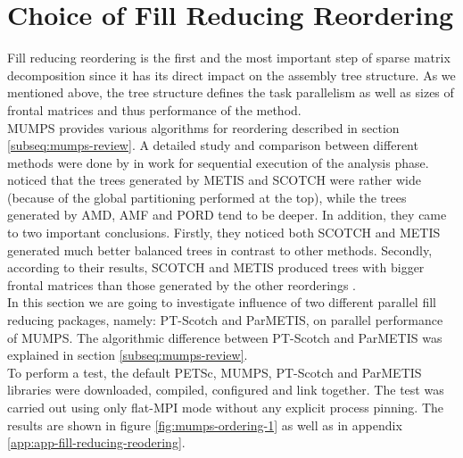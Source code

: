 \section{Choice of Fill Reducing Reordering}
\label{subseq:fill-in-reordering}

Fill reducing reordering is the first and the most important step of sparse matrix decomposition since it has its direct impact on the assembly tree structure. As we mentioned above, the tree structure defines the task parallelism as well as sizes of frontal matrices and thus performance of the method.\\


MUMPS provides various algorithms for reordering described in section \ref{subseq:mumps-review}. A detailed study and comparison between different methods were done by \citeauthor{guermouche2003memory} in work \cite{guermouche2003memory} for sequential execution of the analysis phase. \citeauthor{guermouche2003memory} noticed that the trees generated by METIS and SCOTCH were rather wide (because of the global partitioning performed at the top), while the trees generated by AMD, AMF and PORD tend to be deeper. In addition, they came to two important conclusions. Firstly, they noticed both SCOTCH and METIS generated much better balanced trees in contrast to other methods. Secondly, according to their results, SCOTCH and METIS produced trees with bigger frontal matrices than those generated by the other reorderings \cite{guermouche2003memory}.\\


In this section we are going to investigate influence of two different parallel fill reducing packages, namely: PT-Scotch and ParMETIS, on parallel performance of MUMPS. The algorithmic difference between PT-Scotch and ParMETIS was explained in section \ref{subseq:mumps-review}.\\


To perform a test, the default PETSc, MUMPS, PT-Scotch and ParMETIS libraries were downloaded, compiled, configured and link together. The test was carried out using only flat-MPI mode without any explicit process pinning. The results are shown in figure \ref{fig:mumps-ordering-1} as well as in appendix \ref{app:app-fill-reducing-reodering}.\\


